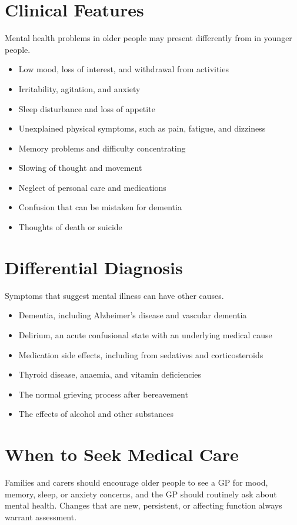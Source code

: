 \section*{Clinical Features}
Mental health problems in older people may present differently from in younger people.
\begin{itemize}
    \item Low mood, loss of interest, and withdrawal from activities
    \item Irritability, agitation, and anxiety
    \item Sleep disturbance and loss of appetite
    \item Unexplained physical symptoms, such as pain, fatigue, and dizziness
    \item Memory problems and difficulty concentrating
    \item Slowing of thought and movement
    \item Neglect of personal care and medications
    \item Confusion that can be mistaken for dementia
    \item Thoughts of death or suicide
\end{itemize}

\section*{Differential Diagnosis}
Symptoms that suggest mental illness can have other causes.
\begin{itemize}
    \item Dementia, including Alzheimer's disease and vascular dementia
    \item Delirium, an acute confusional state with an underlying medical cause
    \item Medication side effects, including from sedatives and corticosteroids
    \item Thyroid disease, anaemia, and vitamin deficiencies
    \item The normal grieving process after bereavement
    \item The effects of alcohol and other substances
\end{itemize}

\section*{When to Seek Medical Care}
Families and carers should encourage older people to see a GP for mood, memory, sleep, or anxiety concerns, and the GP should routinely ask about mental health. Changes that are new, persistent, or affecting function always warrant assessment.


